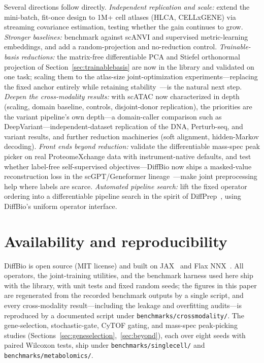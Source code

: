 \documentclass[10pt,twocolumn]{article}
\begin{document}
Several directions follow directly. \emph{Independent replication and scale:} extend the
mini-batch, fit-once design to 1M+ cell atlases (HLCA, CELLxGENE) via streaming covariance
estimation, testing whether the gain continues to grow. \emph{Stronger baselines:}
benchmark against scANVI and supervised metric-learning embeddings, and add a
random-projection and no-reduction control. \emph{Trainable-basis reductions:} the
matrix-free differentiable PCA and Stiefel orthonormal projection of
Section~\ref{sec:trainablebasis} are now in the library and validated on one task; scaling
them to the atlas-size joint-optimization experiments---replacing the fixed anchor entirely
while retaining stability~\citep{wang2019backprop}---is the natural next step.
\emph{Deepen the cross-modality results:} with scATAC now characterized in depth (scaling,
domain baseline, controls, disjoint-donor replication), the priorities are the variant
pipeline's own depth---a domain-caller comparison such as DeepVariant---independent-dataset
replication of the DNA, Perturb-seq, and variant results, and further reduction machineries
(soft alignment, hidden-Markov decoding). \emph{Front ends beyond reduction:} validate the differentiable mass-spec peak picker on real
ProteomeXchange data with instrument-native defaults, and test whether label-free
self-supervised objectives---DiffBio now ships a masked-value reconstruction loss in the
scGPT/Geneformer lineage~\citep{cui2024scgpt,theodoris2023geneformer,he2022mae}---make joint
preprocessing help where labels are scarce. \emph{Automated pipeline
search:} lift the fixed operator ordering into a differentiable pipeline search in the
spirit of DiffPrep~\citep{li2023diffprep}, using DiffBio's uniform operator interface.

\section{Availability and reproducibility}

DiffBio is open source (MIT license) and built on JAX~\citep{jax2018} and Flax
NNX~\citep{flax2020}. All operators, the joint-training utilities, and the benchmark
harness used here ship with the library, with unit tests and fixed random seeds; the
figures in this paper are regenerated from the recorded benchmark outputs by a single
script, and every cross-modality result---including the leakage and overfitting audits---is
reproduced by a documented script under \texttt{benchmarks/crossmodality/}. The
gene-selection, stochastic-gate, CyTOF gating, and mass-spec peak-picking studies
(Sections~\ref{sec:geneselection},~\ref{sec:beyond}), each over eight seeds with paired
Wilcoxon tests, ship under \texttt{benchmarks/singlecell/} and
\texttt{benchmarks/metabolomics/}.
\end{document}
